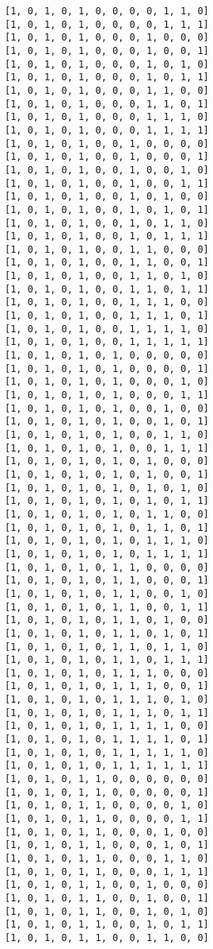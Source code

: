 \documentclass[11pt]{article}
\begin{document}
\begin{Verbatim}[commandchars=\\\{\}]
[1, 0, 1, 0, 1, 0, 0, 0, 0, 1, 1, 0]
[1, 0, 1, 0, 1, 0, 0, 0, 0, 1, 1, 1]
[1, 0, 1, 0, 1, 0, 0, 0, 1, 0, 0, 0]
[1, 0, 1, 0, 1, 0, 0, 0, 1, 0, 0, 1]
[1, 0, 1, 0, 1, 0, 0, 0, 1, 0, 1, 0]
[1, 0, 1, 0, 1, 0, 0, 0, 1, 0, 1, 1]
[1, 0, 1, 0, 1, 0, 0, 0, 1, 1, 0, 0]
[1, 0, 1, 0, 1, 0, 0, 0, 1, 1, 0, 1]
[1, 0, 1, 0, 1, 0, 0, 0, 1, 1, 1, 0]
[1, 0, 1, 0, 1, 0, 0, 0, 1, 1, 1, 1]
[1, 0, 1, 0, 1, 0, 0, 1, 0, 0, 0, 0]
[1, 0, 1, 0, 1, 0, 0, 1, 0, 0, 0, 1]
[1, 0, 1, 0, 1, 0, 0, 1, 0, 0, 1, 0]
[1, 0, 1, 0, 1, 0, 0, 1, 0, 0, 1, 1]
[1, 0, 1, 0, 1, 0, 0, 1, 0, 1, 0, 0]
[1, 0, 1, 0, 1, 0, 0, 1, 0, 1, 0, 1]
[1, 0, 1, 0, 1, 0, 0, 1, 0, 1, 1, 0]
[1, 0, 1, 0, 1, 0, 0, 1, 0, 1, 1, 1]
[1, 0, 1, 0, 1, 0, 0, 1, 1, 0, 0, 0]
[1, 0, 1, 0, 1, 0, 0, 1, 1, 0, 0, 1]
[1, 0, 1, 0, 1, 0, 0, 1, 1, 0, 1, 0]
[1, 0, 1, 0, 1, 0, 0, 1, 1, 0, 1, 1]
[1, 0, 1, 0, 1, 0, 0, 1, 1, 1, 0, 0]
[1, 0, 1, 0, 1, 0, 0, 1, 1, 1, 0, 1]
[1, 0, 1, 0, 1, 0, 0, 1, 1, 1, 1, 0]
[1, 0, 1, 0, 1, 0, 0, 1, 1, 1, 1, 1]
[1, 0, 1, 0, 1, 0, 1, 0, 0, 0, 0, 0]
[1, 0, 1, 0, 1, 0, 1, 0, 0, 0, 0, 1]
[1, 0, 1, 0, 1, 0, 1, 0, 0, 0, 1, 0]
[1, 0, 1, 0, 1, 0, 1, 0, 0, 0, 1, 1]
[1, 0, 1, 0, 1, 0, 1, 0, 0, 1, 0, 0]
[1, 0, 1, 0, 1, 0, 1, 0, 0, 1, 0, 1]
[1, 0, 1, 0, 1, 0, 1, 0, 0, 1, 1, 0]
[1, 0, 1, 0, 1, 0, 1, 0, 0, 1, 1, 1]
[1, 0, 1, 0, 1, 0, 1, 0, 1, 0, 0, 0]
[1, 0, 1, 0, 1, 0, 1, 0, 1, 0, 0, 1]
[1, 0, 1, 0, 1, 0, 1, 0, 1, 0, 1, 0]
[1, 0, 1, 0, 1, 0, 1, 0, 1, 0, 1, 1]
[1, 0, 1, 0, 1, 0, 1, 0, 1, 1, 0, 0]
[1, 0, 1, 0, 1, 0, 1, 0, 1, 1, 0, 1]
[1, 0, 1, 0, 1, 0, 1, 0, 1, 1, 1, 0]
[1, 0, 1, 0, 1, 0, 1, 0, 1, 1, 1, 1]
[1, 0, 1, 0, 1, 0, 1, 1, 0, 0, 0, 0]
[1, 0, 1, 0, 1, 0, 1, 1, 0, 0, 0, 1]
[1, 0, 1, 0, 1, 0, 1, 1, 0, 0, 1, 0]
[1, 0, 1, 0, 1, 0, 1, 1, 0, 0, 1, 1]
[1, 0, 1, 0, 1, 0, 1, 1, 0, 1, 0, 0]
[1, 0, 1, 0, 1, 0, 1, 1, 0, 1, 0, 1]
[1, 0, 1, 0, 1, 0, 1, 1, 0, 1, 1, 0]
[1, 0, 1, 0, 1, 0, 1, 1, 0, 1, 1, 1]
[1, 0, 1, 0, 1, 0, 1, 1, 1, 0, 0, 0]
[1, 0, 1, 0, 1, 0, 1, 1, 1, 0, 0, 1]
[1, 0, 1, 0, 1, 0, 1, 1, 1, 0, 1, 0]
[1, 0, 1, 0, 1, 0, 1, 1, 1, 0, 1, 1]
[1, 0, 1, 0, 1, 0, 1, 1, 1, 1, 0, 0]
[1, 0, 1, 0, 1, 0, 1, 1, 1, 1, 0, 1]
[1, 0, 1, 0, 1, 0, 1, 1, 1, 1, 1, 0]
[1, 0, 1, 0, 1, 0, 1, 1, 1, 1, 1, 1]
[1, 0, 1, 0, 1, 1, 0, 0, 0, 0, 0, 0]
[1, 0, 1, 0, 1, 1, 0, 0, 0, 0, 0, 1]
[1, 0, 1, 0, 1, 1, 0, 0, 0, 0, 1, 0]
[1, 0, 1, 0, 1, 1, 0, 0, 0, 0, 1, 1]
[1, 0, 1, 0, 1, 1, 0, 0, 0, 1, 0, 0]
[1, 0, 1, 0, 1, 1, 0, 0, 0, 1, 0, 1]
[1, 0, 1, 0, 1, 1, 0, 0, 0, 1, 1, 0]
[1, 0, 1, 0, 1, 1, 0, 0, 0, 1, 1, 1]
[1, 0, 1, 0, 1, 1, 0, 0, 1, 0, 0, 0]
[1, 0, 1, 0, 1, 1, 0, 0, 1, 0, 0, 1]
[1, 0, 1, 0, 1, 1, 0, 0, 1, 0, 1, 0]
[1, 0, 1, 0, 1, 1, 0, 0, 1, 0, 1, 1]
[1, 0, 1, 0, 1, 1, 0, 0, 1, 1, 0, 0]

\end{Verbatim}
\end{document}
